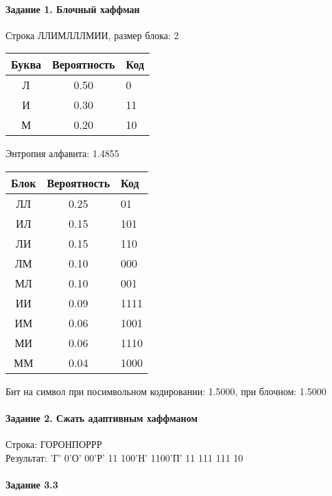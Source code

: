\documentclass[a4paper, 12pt]{article}
\begin{document}
\paragraph{Задание 1. Блочный хаффман \\}

Строка ЛЛИМЛЛЛМИИ, размер блока: 2
\begin{center}
 \begin{tabular}{ |c|c|l| } 
  \hline
     Буква & Вероятность & Код\\ \hline
Л & 0.50 & 0\\\hline
И & 0.30 & 11\\\hline
М & 0.20 & 10
\\ \hline \end{tabular}
\end{center}
Энтропия алфавита: 1.4855
\begin{center}
 \begin{tabular}{ |c|c|l| } 
  \hline
     Блок & Вероятность & Код\\ \hline
ЛЛ & 0.25 & 01\\\hline
ИЛ & 0.15 & 101\\\hline
ЛИ & 0.15 & 110\\\hline
ЛМ & 0.10 & 000\\\hline
МЛ & 0.10 & 001\\\hline
ИИ & 0.09 & 1111\\\hline
ИМ & 0.06 & 1001\\\hline
МИ & 0.06 & 1110\\\hline
ММ & 0.04 & 1000
\\ \hline \end{tabular}
\end{center}
Бит на символ при посимвольном кодировании: 1.5000, при блочном: 1.5000


\pagebreak
\paragraph{Задание 2. Сжать адаптивным хаффманом\\}

Строка: 
ГОРОНПОРРР\\
Результат: 'Г' 0'О' 00'Р' 11 100'Н' 1100'П' 11 111 111 10










\pagebreak

\paragraph{Задание 3.3}
\end{document}
